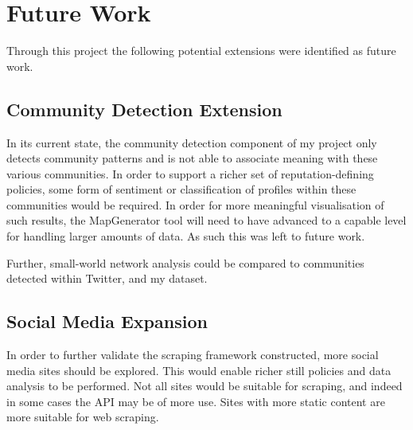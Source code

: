 


\section{Future Work}

Through this project the following potential extensions were identified as future work.

\subsection{Community Detection Extension}

In its current state, the community detection component of my project only detects community patterns and is not able to associate meaning with these various communities. In order to support a richer set of reputation-defining policies, some form of sentiment or classification of profiles within these communities would be required. In order for more meaningful visualisation of such results, the MapGenerator tool will need to have advanced to a capable level for handling larger amounts of data. As such this was left to future work.

Further, small-world network analysis could be compared to communities detected within Twitter, and my dataset. 

\subsection{Social Media Expansion}

In order to further validate the scraping framework constructed, more social media sites should be explored. This would enable richer still policies and data analysis to be performed. Not all sites would be suitable for scraping, and indeed in some cases the API may be of more use. Sites with more static content are more suitable for web scraping. 



